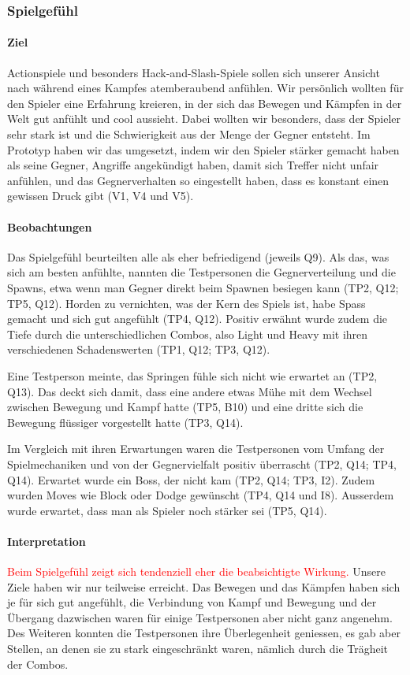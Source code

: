 \documentclass[../Main.tex]{subfiles}
\begin{document}
\subsubsection{Spielgefühl}

\paragraph{Ziel}
Actionspiele und besonders Hack-and-Slash-Spiele sollen sich unserer Ansicht nach während eines Kampfes atemberaubend anfühlen. Wir persönlich wollten für den Spieler eine Erfahrung kreieren, in der sich das Bewegen und Kämpfen in der Welt gut anfühlt und cool aussieht. Dabei wollten wir besonders, dass der Spieler sehr stark ist und die Schwierigkeit aus der Menge der Gegner entsteht. Im Prototyp haben wir das umgesetzt, indem wir den Spieler stärker gemacht haben als seine Gegner, Angriffe angekündigt haben, damit sich Treffer nicht unfair anfühlen, und das Gegnerverhalten so eingestellt haben, dass es konstant einen gewissen Druck gibt (V1, V4 und V5).

\paragraph{Beobachtungen}
Das Spielgefühl beurteilten alle als eher befriedigend (jeweils Q9). Als das, was sich am besten anfühlte, nannten die Testpersonen die Gegnerverteilung und die Spawns, etwa wenn man Gegner direkt beim Spawnen besiegen kann (TP2, Q12; TP5, Q12). Horden zu vernichten, was der Kern des Spiels ist, habe Spass gemacht und sich gut angefühlt (TP4, Q12). Positiv erwähnt wurde zudem die Tiefe durch die unterschiedlichen Combos, also Light und Heavy mit ihren verschiedenen Schadenswerten (TP1, Q12; TP3, Q12).

Eine Testperson meinte, das Springen fühle sich nicht wie erwartet an (TP2, Q13). Das deckt sich damit, dass eine andere etwas Mühe mit dem Wechsel zwischen Bewegung und Kampf hatte (TP5, B10) und eine dritte sich die Bewegung flüssiger vorgestellt hatte (TP3, Q14).

Im Vergleich mit ihren Erwartungen waren die Testpersonen vom Umfang der Spielmechaniken und von der Gegnervielfalt positiv überrascht (TP2, Q14; TP4, Q14). Erwartet wurde ein Boss, der nicht kam (TP2, Q14; TP3, I2). Zudem wurden Moves wie Block oder Dodge gewünscht (TP4, Q14 und I8). Ausserdem wurde erwartet, dass man als Spieler noch stärker sei (TP5, Q14).

\paragraph{Interpretation}
\textcolor{red}{Beim Spielgefühl zeigt sich tendenziell eher die beabsichtigte Wirkung.} Unsere Ziele haben wir nur teilweise erreicht. Das Bewegen und das Kämpfen haben sich je für sich gut angefühlt, die Verbindung von Kampf und Bewegung und der Übergang dazwischen waren für einige Testpersonen aber nicht ganz angenehm. Des Weiteren konnten die Testpersonen ihre Überlegenheit geniessen, es gab aber Stellen, an denen sie zu stark eingeschränkt waren, nämlich durch die Trägheit der Combos.
\end{document}
